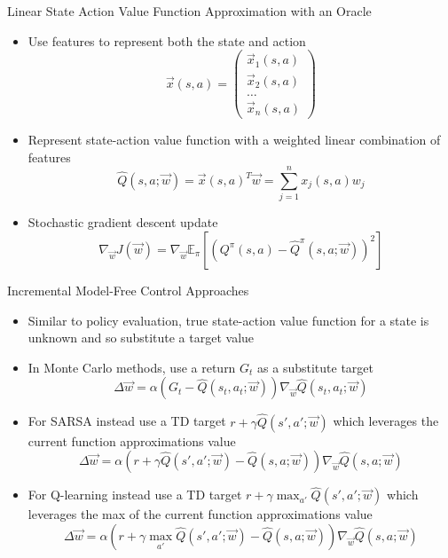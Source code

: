 \documentclass[aspectratio=169]{../latex_main/tntbeamer}  %
\begin{document}
\begin{frame}[c]{Linear State Action Value Function Approximation with an
		Oracle}
	
	\begin{itemize}
		\item Use features to represent both the state and action
		$$\vec{x}(s,a) = \begin{pmatrix}
		\vec{x}_1(s,a)\\
		\vec{x}_2(s,a)\\
		\ldots\\
		\vec{x}_n(s,a)
		\end{pmatrix} $$
		\item Represent state-action value function with a weighted linear
		combination of features
		$$\hat{Q}(s,a;\vec{w}) = \vec{x}(s,a)^T \vec{w} = \sum_{j=1}^n x_j(s,a)w_j $$
		\item Stochastic gradient descent update
		$$\nabla_{\vec{w}} J(\vec{w}) = \nabla_{\vec{w}} \mathbb{E}_\pi [(Q^\pi(s,a) - \hat{Q}^\pi(s,a;\vec{w}))^2] $$
	\end{itemize}
	
\end{frame}
\begin{frame}[c]{Incremental Model-Free Control Approaches}
	
	\begin{itemize}
		\item Similar to policy evaluation, true state-action value function for a state is unknown and so substitute a target value
		\item In Monte Carlo methods, use a return $G_t$ as a substitute target
		$$\Delta \vec{w} = \alpha(G_t - \hat{Q}(s_t,a_t; \vec{w})) \nabla_{\vec{w}} \hat{Q}(s_t, a_t; \vec{w}) $$
		\item For SARSA instead use a TD target $r+ \gamma \hat{Q}(s', a'; \vec{w})$ which leverages the current function approximations value
		$$\Delta \vec{w} = \alpha (r + \gamma \hat{Q}(s',a';\vec{w}) - \hat{Q}(s,a;\vec{w})) \nabla_{\vec{w}}\hat{Q}(s,a;\vec{w}) $$
		\item For Q-learning instead use a TD target $r + \gamma \max_{a'} \hat{Q}(s',a';\vec{w})$ which leverages the max of the current function approximations value
		$$\Delta \vec{w} = \alpha (r + \gamma \max_{a'} \hat{Q}(s',a';\vec{w}) - \hat{Q}(s,a;\vec{w})) \nabla_{\vec{w}}\hat{Q}(s,a;\vec{w}) $$
	\end{itemize}
	
\end{frame}
\end{document}
